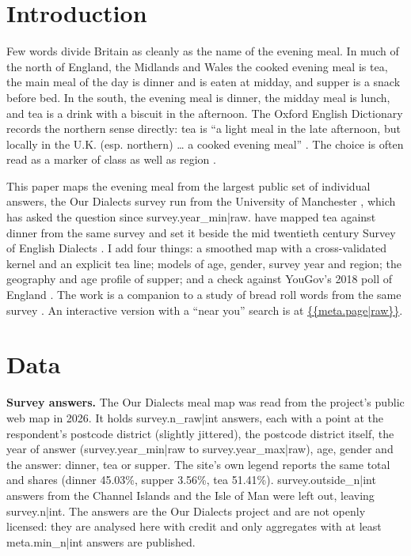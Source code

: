 \documentclass[11pt,a4paper]{article}
\begin{document}
\section{Introduction}
Few words divide Britain as cleanly as the name of the evening meal. In much of the north of England, the Midlands and Wales the cooked evening meal is tea, the main meal of the day is dinner and is eaten at midday, and supper is a snack before bed. In the south, the evening meal is dinner, the midday meal is lunch, and tea is a drink with a biscuit in the afternoon. The Oxford English Dictionary records the northern sense directly: tea is ``a light meal in the late afternoon, but locally in the U.K. (esp. northern) \ldots{} a cooked evening meal'' \citep{oed}. The choice is often read as a marker of class as well as region \citep{fox}.

This paper maps the evening meal from the largest public set of individual answers, the Our Dialects survey run from the University of Manchester \citep{ourdialects}, which has asked the question since {{survey.year_min|raw}}. \citet{mackenzie} have mapped tea against dinner from the same survey and set it beside the mid twentieth century Survey of English Dialects \citep{sed}. I add four things: a smoothed map with a cross-validated kernel and an explicit tea line; models of age, gender, survey year and region; the geography and age profile of supper; and a check against YouGov's 2018 poll of England \citep{yougov}. The work is a companion to a study of bread roll words from the same survey \citep{rolls}. An interactive version with a ``near you'' search is at \url{{{meta.page|raw}}}.

\section{Data}
\textbf{Survey answers.} The Our Dialects meal map was read from the project's public web map in 2026. It holds {{survey.n_raw|int}} answers, each with a point at the respondent's postcode district (slightly jittered), the postcode district itself, the year of answer ({{survey.year_min|raw}} to {{survey.year_max|raw}}), age, gender and the answer: dinner, tea or supper. The site's own legend reports the same total and shares (dinner 45.03\%, supper 3.56\%, tea 51.41\%). {{survey.outside_n|int}} answers from the Channel Islands and the Isle of Man were left out, leaving {{survey.n|int}}. The answers are \textcopyright{} the Our Dialects project and are not openly licensed: they are analysed here with credit and only aggregates with at least {{meta.min_n|int}} answers are published.
\end{document}
